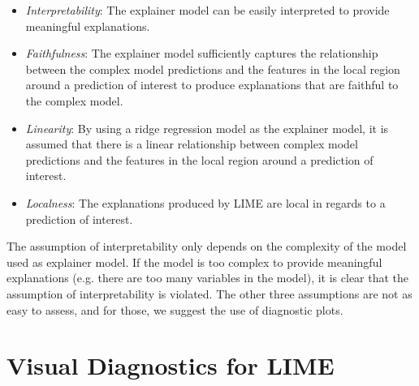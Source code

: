 \documentclass[AMS,STIX2COL]{WileyNJD-v2}\usepackage[]{graphicx}\usepackage[]{color}
\begin{document}
\begin{itemize}
\item \emph{Interpretability}: The explainer model can be easily interpreted to provide meaningful explanations.
\item \emph{Faithfulness}: The explainer model sufficiently captures the relationship between the complex model predictions and the features in the local region around a prediction of interest to produce explanations that are faithful to the complex model.
\item \emph{Linearity}: By using a ridge regression model as the explainer model, it is assumed that there is a linear relationship between complex model predictions and the features in the local region around a prediction of interest.
\item \emph{Localness}: The explanations produced by LIME are local in regards to a prediction of interest.
\end{itemize}

The assumption of interpretability only depends on the complexity of the model used as explainer model. If the model is too complex to provide meaningful explanations (e.g. there are too many variables in the model), it is clear that the assumption of interpretability is violated. The other three assumptions are not as easy to assess, and for those, we suggest the use of diagnostic plots. 

\section{Visual Diagnostics for LIME} \label{diagnostics}
\end{document}
